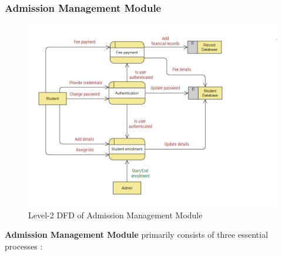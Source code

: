 \documentclass[12pt,a4paper]{article}
\begin{document}
\subsubsection{Admission Management Module}
\begin{figure}[H]
    \centering
        \includegraphics[width=\linewidth]{Student_enrollment_level2DFD.png} 
    \caption{Level-2 DFD of Admission Management Module}
\end{figure}
\textbf{Admission Management Module} primarily consists of three essential processes :
\end{document}
